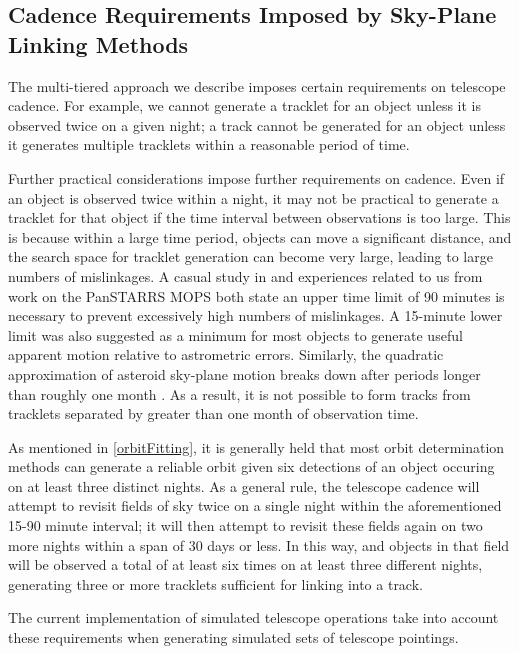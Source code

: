 \documentclass[12pt,preprint]{aastex}
\begin{document}
\subsection{Cadence Requirements Imposed by Sky-Plane Linking Methods}

The multi-tiered approach we describe imposes certain requirements on
telescope cadence.  For example, we cannot generate a tracklet for an
object unless it is observed twice on a given night; a track cannot be
generated for an object unless it generates multiple tracklets within
a reasonable period of time.

Further practical considerations impose further requirements on
cadence. Even if an object is observed twice within a night, it may
not be practical to generate a tracklet for that object if the time
interval between observations is too large.  This is because within a
large time period, objects can move a significant distance, and the
search space for tracklet generation can become very large, leading to
large numbers of mislinkages.  A casual study in \citet{kubica_thesis}
and experiences related to us from work on the PanSTARRS MOPS both
state an upper time limit of 90 minutes is necessary to prevent
excessively high numbers of mislinkages. A 15-minute lower limit was
also suggested as a minimum for most objects to generate useful
apparent motion relative to astrometric errors. Similarly, the
quadratic approximation of asteroid sky-plane motion breaks down after
periods longer than roughly one month \citep{kubica_thesis}.  As a
result, it is not possible to form tracks from tracklets separated by
greater than one month of observation time.

As mentioned in \ref{orbitFitting}, it is generally held that most
orbit determination methods can generate a reliable orbit given six
detections of an object occuring on at least three distinct nights.
As a general rule, the telescope cadence will attempt to revisit
fields of sky twice on a single night within the aforementioned 15-90
minute interval; it will then attempt to revisit these fields again on
two more nights within a span of 30 days or less.  In this way, and
objects in that field will be observed a total of at least six times
on at least three different nights, generating three or more tracklets
sufficient for linking into a track.


The current implementation of simulated telescope operations
take into account these requirements when generating simulated sets of
telescope pointings. 
\end{document}
